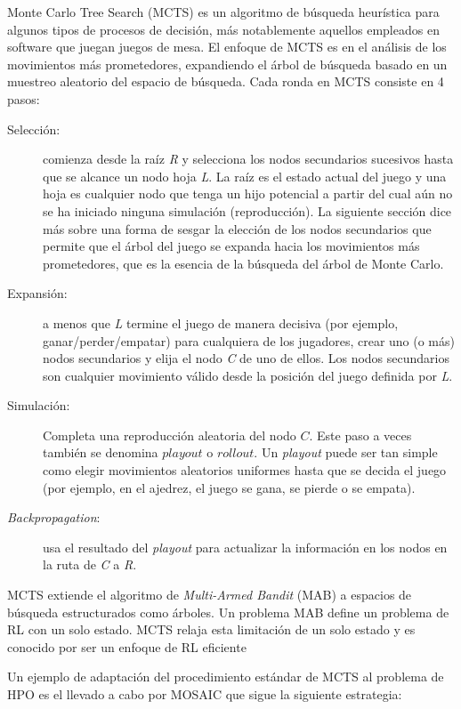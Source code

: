 Monte Carlo Tree Search (MCTS) es un algoritmo de búsqueda heurística para algunos tipos de procesos de decisión, más notablemente aquellos empleados en software que juegan juegos de mesa. El enfoque de MCTS es en el análisis de los movimientos más prometedores, expandiendo el árbol de búsqueda basado en un muestreo aleatorio del espacio de búsqueda. Cada ronda en MCTS consiste en 4 pasos:
\begin{description}
	\item[Selección:] comienza desde la raíz \textit{R} y selecciona los nodos secundarios sucesivos hasta que se alcance un nodo hoja \textit{L}. La raíz es el estado actual del juego y una hoja es cualquier nodo que tenga un hijo potencial a partir del cual aún no se ha iniciado ninguna simulación (reproducción). La siguiente sección dice más sobre una forma de sesgar la elección de los nodos secundarios que permite que el árbol del juego se expanda hacia los movimientos más prometedores, que es la esencia de la búsqueda del árbol de Monte Carlo.
	\item[Expansión:] a menos que \textit{L} termine el juego de manera decisiva (por ejemplo, ganar/perder/empatar) para cualquiera de los jugadores, crear uno (o más) nodos secundarios y elija el nodo \textit{C} de uno de ellos. Los nodos secundarios son cualquier movimiento válido desde la posición del juego definida por \textit{L}.
	\item[Simulación:] Completa una reproducción aleatoria del nodo $C$. Este paso a veces también se denomina $playout$ o $rollout$. Un \textit{playout} puede ser tan simple como elegir movimientos aleatorios uniformes hasta que se decida el juego (por ejemplo, en el ajedrez, el juego se gana, se pierde o se empata).
	\item[\textit{Backpropagation}:] usa el resultado del \textit{playout} para actualizar la información en los nodos en la ruta de \textit{C} a \textit{R}. 
\end{description}

MCTS extiende el algoritmo de \textit{Multi-Armed Bandit} (MAB) a espacios de búsqueda estructurados como árboles. Un problema MAB define un problema de RL con un solo estado. MCTS relaja esta limitación de un solo estado y es conocido por ser un enfoque de RL eficiente \cite{rakotoarison2019automated}

Un ejemplo de adaptación del procedimiento estándar de MCTS al problema de HPO es el llevado a cabo por MOSAIC \cite{rakotoarison2019automated} que sigue la siguiente estrategia:

